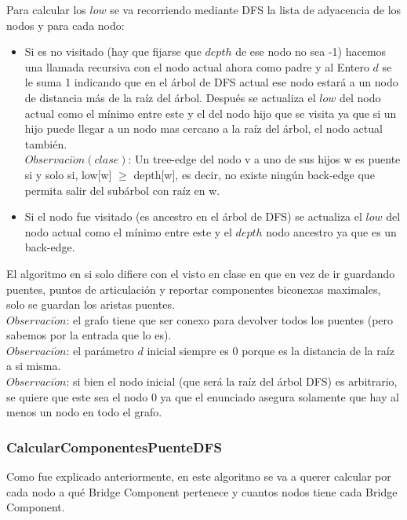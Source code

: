 Para calcular los $low$ se va recorriendo mediante DFS la lista de adyacencia de los nodos y para cada nodo:
\begin{itemize}
	\item Si es no visitado (hay que fijarse que $depth$ de ese nodo no sea -1) hacemos una llamada recursiva con el nodo
	actual ahora como padre y al Entero $d$ se le suma 1 indicando que en el \'arbol de DFS actual ese nodo
	estará a un nodo de distancia más de la raíz del \'arbol. Después se actualiza el $low$ del nodo actual
	como el mínimo entre este y el del nodo hijo que se visita ya que si un hijo puede llegar a un nodo
	mas cercano a la raíz del \'arbol, el nodo actual también. \\
	$Observaci\acute{o}n (clase)$: Un tree-edge del nodo v a uno de sus hijos w es puente si y solo si, low[w] $\ge$ depth[w], es decir, 
	no existe ning\'un back-edge que permita salir del sub\'arbol con ra\'iz en w.
	\item Si el nodo fue visitado (es ancestro en el \'arbol de DFS) se actualiza el $low$ del nodo actual
	como el mínimo entre este y el $depth$ nodo ancestro ya que es un back-edge.
\end{itemize}

El algoritmo en si solo difiere con el visto en clase en que en vez de ir guardando puentes, puntos de 
articulación y reportar componentes biconexas maximales, solo se guardan los aristas puentes. \\

$Observaci\acute{o}n$: el grafo tiene que ser conexo para devolver todos los puentes (pero sabemos por la entrada que lo es). \\

$Observaci\acute{o}n$: el parámetro $d$ inicial siempre es 0 porque es la distancia de la raíz a si misma. \\

$Observaci\acute{o}n$: si bien el nodo inicial (que será la raíz del \'arbol DFS) es arbitrario, se quiere que
este sea el nodo 0 ya que el enunciado asegura solamente que hay al menos un nodo en todo el grafo. \\

\subsubsection*{CalcularComponentesPuenteDFS}

Como fue explicado anteriormente, en este algoritmo se va a querer calcular por cada nodo a qué Bridge Component pertenece
y cuantos nodos tiene cada Bridge Component. \\

